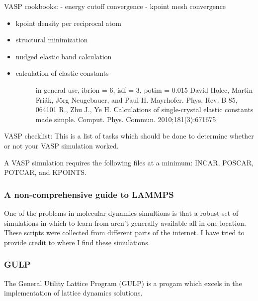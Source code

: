 \documentclass[letterpaper,10pt,english]{sphinxmanual}
\begin{document}
VASP cookbooks:
- energy cutoff convergence
- kpoint mesh convergence
\begin{itemize}
\item {} 
kpoint density per reciprocal atom

\end{itemize}
\begin{itemize}
\item {} 
structural minimization

\item {} 
nudged elastic band calculation

\item {} \begin{description}
\item[{calculation of elastic constants}] \leavevmode
in general use, ibrion = 6, isif = 3, potim = 0.015
David Holec, Martin Friák, Jörg Neugebauer, and Paul H. Mayrhofer. Phys. Rev. B 85, 064101
R., Zhu J., Ye H. Calculations of single-crystal elastic constants made simple. Comput. Phys. Commun. 2010;181(3):671\textendash{}675

\end{description}

\end{itemize}

VASP checklist: This is a list of tasks which should be done to determine whether or not your VASP simulation worked.

A VASP simulation requires the following files at a minimum: INCAR, POSCAR, POTCAR, and KPOINTS.


\subsubsection{A non-comprehensive guide to LAMMPS}
\label{\detokenize{lammps/index:a-non-comprehensive-guide-to-lammps}}\label{\detokenize{lammps/index::doc}}
One of the problems in molecular dynamics simultions is that a robust set of simulations in which to learn from aren’t generally available all in one location.  These scripts were collected from different parts of the internet.  I have tried to provide credit to where I find these simulations.


\subsubsection{GULP}
\label{\detokenize{gulp/index:gulp}}\label{\detokenize{gulp/index:gulp-index}}\label{\detokenize{gulp/index::doc}}
The General Utility Lattice Program (GULP) is a progam which excels in the implementation of lattice dynamics solutions.
\end{document}
